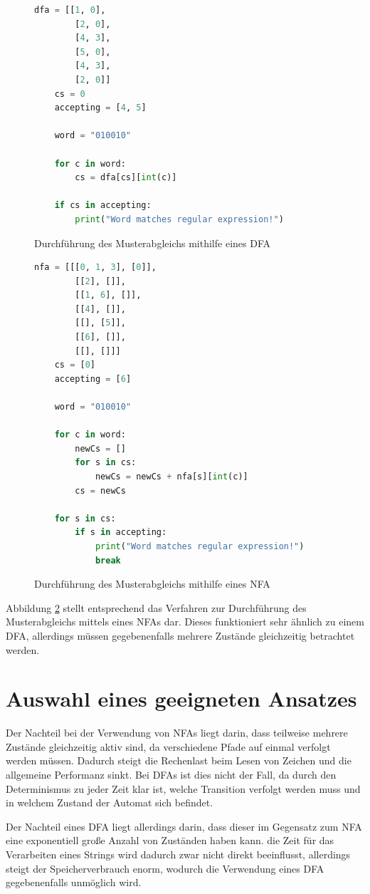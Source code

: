 \begin{figure}[ht]
	\begin{lstlisting}[language=Python]
	dfa = [[1, 0],
		[2, 0],
		[4, 3],
		[5, 0],
		[4, 3],
		[2, 0]]
	cs = 0
	accepting = [4, 5]
	
	word = "010010"
	
	for c in word:
		cs = dfa[cs][int(c)]
	
	if cs in accepting:
		print("Word matches regular expression!")
	\end{lstlisting}
	\caption{Durchführung des Musterabgleichs mithilfe eines DFA}
	\label{dfa_matching}
\end{figure}

\begin{figure}[ht]
	\begin{lstlisting}[language=Python]
	nfa = [[[0, 1, 3], [0]],
		[[2], []],
		[[1, 6], []],
		[[4], []],
		[[], [5]],
		[[6], []],
		[[], []]]
	cs = [0]
	accepting = [6]
	
	word = "010010"
	
	for c in word:
		newCs = []
		for s in cs:
			newCs = newCs + nfa[s][int(c)]
		cs = newCs
	
	for s in cs:
		if s in accepting:
			print("Word matches regular expression!")
			break
	\end{lstlisting}
	\caption{Durchführung des Musterabgleichs mithilfe eines NFA}
	\label{nfa_matching}
\end{figure}

Abbildung \ref{nfa_matching} stellt entsprechend das Verfahren zur Durchführung des Musterabgleichs mittels eines NFAs dar.
Dieses funktioniert sehr ähnlich zu einem DFA, allerdings müssen gegebenenfalls mehrere Zustände gleichzeitig betrachtet werden.

\section{Auswahl eines geeigneten Ansatzes}

Der Nachteil bei der Verwendung von NFAs liegt darin, dass teilweise mehrere Zustände gleichzeitig aktiv sind, da verschiedene Pfade auf einmal verfolgt werden müssen.
Dadurch steigt die Rechenlast beim Lesen von Zeichen und die allgemeine Performanz sinkt.
Bei DFAs ist dies nicht der Fall, da durch den Determinismus zu jeder Zeit klar ist, welche Transition verfolgt werden muss und in welchem Zustand der Automat sich befindet.

Der Nachteil eines DFA liegt allerdings darin, dass dieser im Gegensatz zum NFA eine exponentiell große Anzahl von Zuständen haben kann.
die Zeit für das Verarbeiten eines Strings wird dadurch zwar nicht direkt beeinflusst, allerdings steigt der Speicherverbrauch enorm, wodurch die Verwendung eines DFA gegebenenfalls unmöglich wird.

